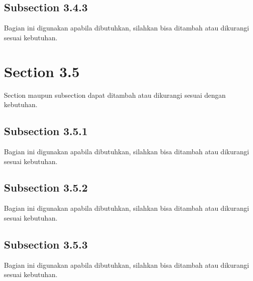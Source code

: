 \subsection{Subsection 3.4.3}
Bagian ini digunakan apabila dibutuhkan, silahkan bisa ditambah atau dikurangi sesuai kebutuhan.

\section{Section 3.5}
Section maupun subsection dapat ditambah atau dikurangi sesuai dengan kebutuhan.

\subsection{Subsection 3.5.1}
Bagian ini digunakan apabila dibutuhkan, silahkan bisa ditambah atau dikurangi sesuai kebutuhan.

\subsection{Subsection 3.5.2}
Bagian ini digunakan apabila dibutuhkan, silahkan bisa ditambah atau dikurangi sesuai kebutuhan.

\subsection{Subsection 3.5.3}
Bagian ini digunakan apabila dibutuhkan, silahkan bisa ditambah atau dikurangi sesuai kebutuhan.